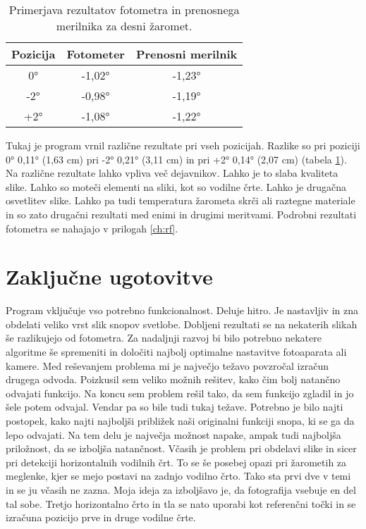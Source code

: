 \documentclass[oneside, a4paper, 12pt]{book}
\begin{document}
\begin{table}
\begin{center}
\begin{tabular}{c|c|c}
\textbf{Pozicija} & \textbf{Fotometer} & \textbf{Prenosni merilnik} \\ \hline
0° & -1,02° & -1,23°  \\ \hline
-2°  & -0,98° & -1,19°   \\ \hline
+2°  & -1,08° & -1,22°   \\ 
\end{tabular}
\end{center}
\vspace{-20pt}
\caption{Primerjava rezultatov fotometra in prenosnega merilnika za desni žaromet.}

\label{tbl:primerjava-desni}
\end{table}

Tukaj je program vrnil različne rezultate pri vseh pozicijah. Razlike so pri poziciji 0° 0,11° (1,63 cm) pri -2° 0,21° (3,11 cm) in pri +2° 0,14° (2,07 cm) (tabela \ref{tbl:primerjava-desni}). Na različne rezultate lahko vpliva več dejavnikov. Lahko je to slaba kvaliteta slike. Lahko so moteči elementi na sliki, kot so vodilne črte. Lahko je drugačna osvetlitev slike. Lahko pa tudi temperatura žarometa skrči ali raztegne materiale in so zato drugačni rezultati med enimi in drugimi meritvami. Podrobni rezultati fotometra se nahajajo v prilogah \ref{ch:rf}.

\chapter{Zaključne ugotovitve}
\label{ch:zakljucek}
Program vključuje vso potrebno funkcionalnost. Deluje hitro. Je nastavljiv in zna obdelati veliko vrst slik snopov svetlobe. Dobljeni rezultati se na nekaterih slikah še razlikujejo od fotometra. Za nadaljnji razvoj bi bilo potrebno nekatere algoritme še spremeniti in določiti najbolj optimalne nastavitve fotoaparata ali kamere. Med reševanjem problema mi je največjo težavo povzročal izračun drugega odvoda. Poizkusil sem veliko možnih rešitev, kako čim bolj natančno odvajati funkcijo. Na koncu sem problem rešil tako, da sem funkcijo zgladil in jo šele potem odvajal. Vendar pa so bile tudi tukaj težave. Potrebno je bilo najti postopek, kako najti najboljši približek naši originalni funkciji snopa, ki se ga da lepo odvajati. Na tem delu je največja možnost napake, ampak tudi najboljša priložnost, da se izboljša natančnost. Včasih je problem pri obdelavi slike in sicer pri detekciji horizontalnih vodilnih črt. To se še posebej opazi pri žarometih za meglenke, kjer se mejo postavi na zadnjo vodilno črto. Tako sta prvi dve v temi in se ju včasih ne zazna. Moja ideja za izboljšavo je, da fotografija vsebuje en del tal sobe. Tretjo horizontalno črto in tla se nato uporabi kot referenčni točki in se izračuna pozicijo prve in druge vodilne črte.
\end{document}
